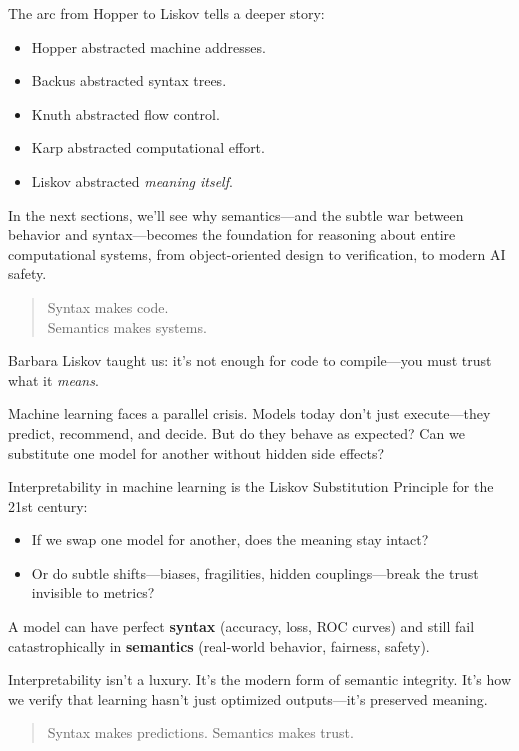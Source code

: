 The arc from Hopper to Liskov tells a deeper story:

\begin{itemize}
  \item Hopper abstracted machine addresses.
  \item Backus abstracted syntax trees.
  \item Knuth abstracted flow control.
  \item Karp abstracted computational effort.
  \item Liskov abstracted \textit{meaning itself}.
\end{itemize}

In the next sections, we’ll see why semantics—and the subtle war between behavior and syntax—becomes the foundation for reasoning about entire computational systems, from object-oriented design to verification, to modern AI safety.

\begin{quote}
Syntax makes code.\\
Semantics makes systems.
\end{quote}

\begin{tcolorbox}[colback=gray!5!white, colframe=black, title=\textbf{Sidebar: Meaning, Models, and the Hidden Cost of Black Boxes},fonttitle=\bfseries]

    Barbara Liskov taught us: it’s not enough for code to compile—you must trust what it \emph{means}.
    \medskip
    
    Machine learning faces a parallel crisis. Models today don’t just execute—they predict, recommend, and decide. But do they behave as expected? Can we substitute one model for another without hidden side effects?
    \medskip
    
    Interpretability in machine learning is the Liskov Substitution Principle for the 21st century:
    \medskip
    
    \begin{itemize}
    \item If we swap one model for another, does the meaning stay intact?
    \item Or do subtle shifts—biases, fragilities, hidden couplings—break the trust invisible to metrics?
    \end{itemize}

    \medskip
    
    A model can have perfect \textbf{syntax} (accuracy, loss, ROC curves) and still fail catastrophically in \textbf{semantics} (real-world behavior, fairness, safety).
    
    \medskip
    
    Interpretability isn’t a luxury. It’s the modern form of semantic integrity.  
    It's how we verify that learning hasn’t just optimized outputs—it’s preserved meaning.
    
    \begin{quote}
    Syntax makes predictions. Semantics makes trust.
    \end{quote}
    
\end{tcolorbox}



